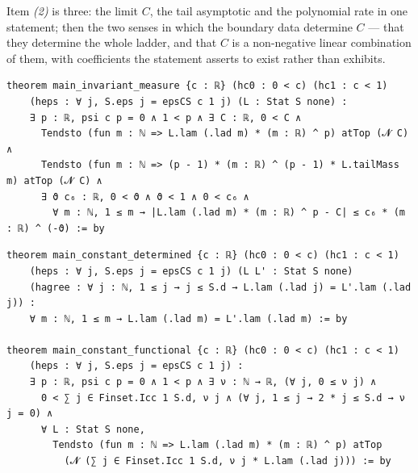 Item \emph{(2)} is three: the limit $C$, the tail asymptotic and the polynomial rate in one
statement; then the two senses in which the boundary data determine $C$ --- that they determine
the whole ladder, and that $C$ is a non-negative linear combination of them, with coefficients
the statement asserts to exist rather than exhibits.
\begin{lstlisting}[style=lean]
theorem main_invariant_measure {c : ℝ} (hc0 : 0 < c) (hc1 : c < 1)
    (heps : ∀ j, S.eps j = epsCS c 1 j) (L : Stat S none) :
    ∃ p : ℝ, psi c p = 0 ∧ 1 < p ∧ ∃ C : ℝ, 0 < C ∧
      Tendsto (fun m : ℕ => L.lam (.lad m) * (m : ℝ) ^ p) atTop (𝓝 C) ∧
      Tendsto (fun m : ℕ => (p - 1) * (m : ℝ) ^ (p - 1) * L.tailMass m) atTop (𝓝 C) ∧
      ∃ ϑ c₆ : ℝ, 0 < ϑ ∧ ϑ < 1 ∧ 0 < c₆ ∧
        ∀ m : ℕ, 1 ≤ m → |L.lam (.lad m) * (m : ℝ) ^ p - C| ≤ c₆ * (m : ℝ) ^ (-ϑ) := by
\end{lstlisting}
\begin{lstlisting}[style=lean]
theorem main_constant_determined {c : ℝ} (hc0 : 0 < c) (hc1 : c < 1)
    (heps : ∀ j, S.eps j = epsCS c 1 j) (L L' : Stat S none)
    (hagree : ∀ j : ℕ, 1 ≤ j → j ≤ S.d → L.lam (.lad j) = L'.lam (.lad j)) :
    ∀ m : ℕ, 1 ≤ m → L.lam (.lad m) = L'.lam (.lad m) := by

theorem main_constant_functional {c : ℝ} (hc0 : 0 < c) (hc1 : c < 1)
    (heps : ∀ j, S.eps j = epsCS c 1 j) :
    ∃ p : ℝ, psi c p = 0 ∧ 1 < p ∧ ∃ ν : ℕ → ℝ, (∀ j, 0 ≤ ν j) ∧
      0 < ∑ j ∈ Finset.Icc 1 S.d, ν j ∧ (∀ j, 1 ≤ j → 2 * j ≤ S.d → ν j = 0) ∧
      ∀ L : Stat S none,
        Tendsto (fun m : ℕ => L.lam (.lad m) * (m : ℝ) ^ p) atTop
          (𝓝 (∑ j ∈ Finset.Icc 1 S.d, ν j * L.lam (.lad j))) := by
\end{lstlisting}

